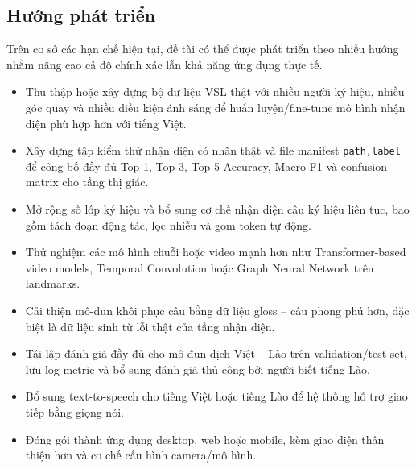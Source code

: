 ﻿\subsection{Hướng phát triển}

Trên cơ sở các hạn chế hiện tại, đề tài có thể được phát triển theo nhiều hướng nhằm nâng cao cả độ chính xác lẫn khả năng ứng dụng thực tế.

\begin{itemize}
    \item Thu thập hoặc xây dựng bộ dữ liệu VSL thật với nhiều người ký hiệu, nhiều góc quay và nhiều điều kiện ánh sáng để huấn luyện/fine-tune mô hình nhận diện phù hợp hơn với tiếng Việt.
    \item Xây dựng tập kiểm thử nhận diện có nhãn thật và file manifest \texttt{path,label} để công bố đầy đủ Top-1, Top-3, Top-5 Accuracy, Macro F1 và confusion matrix cho tầng thị giác.
    \item Mở rộng số lớp ký hiệu và bổ sung cơ chế nhận diện câu ký hiệu liên tục, bao gồm tách đoạn động tác, lọc nhiễu và gom token tự động.
    \item Thử nghiệm các mô hình chuỗi hoặc video mạnh hơn như Transformer-based video models, Temporal Convolution hoặc Graph Neural Network trên landmarks.
    \item Cải thiện mô-đun khôi phục câu bằng dữ liệu gloss -- câu phong phú hơn, đặc biệt là dữ liệu sinh từ lỗi thật của tầng nhận diện.
    \item Tái lập đánh giá đầy đủ cho mô-đun dịch Việt -- Lào trên validation/test set, lưu log metric và bổ sung đánh giá thủ công bởi người biết tiếng Lào.
    \item Bổ sung text-to-speech cho tiếng Việt hoặc tiếng Lào để hệ thống hỗ trợ giao tiếp bằng giọng nói.
    \item Đóng gói thành ứng dụng desktop, web hoặc mobile, kèm giao diện thân thiện hơn và cơ chế cấu hình camera/mô hình.
\end{itemize}


